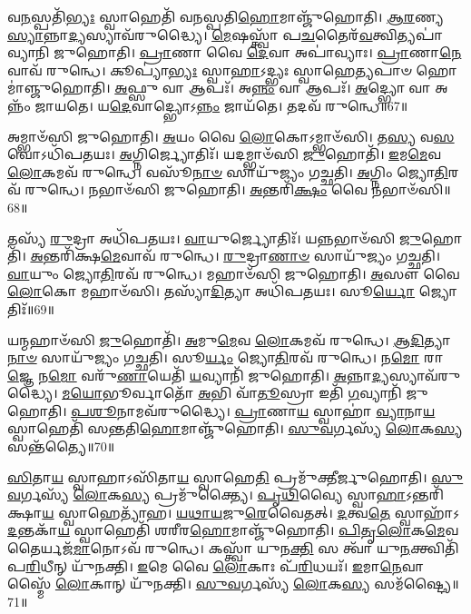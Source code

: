 𑌵\-\ul{𑌨}\-𑌸𑍍𑌪𑌤𑌿᳴\-\ul{𑌭𑍍𑌯𑌃} 𑌸𑍍𑌵𑌾𑌹𑍇𑌤𑌿᳴ 𑌵𑌨𑌸𑍍𑌪𑌤𑌿\-\ul{𑌹𑍋}\-𑌮𑌾𑌞𑍍𑌜𑍁᳴𑌹𑍋𑌤𑌿।
\-\ul{𑌆}\-\-\ul{𑌰}\-𑌣𑍍𑌯\-\ul{𑌸𑍍𑌯𑌾}\-\-𑌨𑍍𑌨𑌾\-\ul{𑌦𑍍𑌯}\-𑌸𑍍𑌯𑌾𑌵᳴𑌰𑍁𑌦𑍍𑌧𑍍𑌯𑍈।
\-\ul{𑌮𑍇}\-𑌷𑌸𑍍𑌤𑍍𑌵𑌾᳴ 𑌪\-\ul{𑌚}\-𑌤𑍈𑌰᳴\-\ul{𑌵}\-𑌤𑍍𑌵𑌿𑌤𑍍𑌯𑌪𑌾॑𑌵𑍍𑌯𑌾𑌨𑌿 𑌜𑍁𑌹𑍋𑌤𑌿।
\-\ul{𑌪𑍍𑌰𑌾}\-𑌣𑌾 𑌵𑍈 \ul{𑌦𑍇}\-𑌵𑌾 𑌅𑌪𑌾॑𑌵𑍍𑌯𑌾𑌃।
\-\ul{𑌪𑍍𑌰𑌾}\-𑌣𑌾\-\ul{𑌨𑍇}\-𑌵𑌾𑌵᳴ 𑌰𑍁𑌨𑍍𑌧𑍇।
𑌕𑍂𑌪𑍍𑌯𑌾॑\-\ul{𑌭𑍍𑌯𑌃} 𑌸𑍍𑌵𑌾\-\ul{𑌹𑌾}\-𑌽𑌦𑍍𑌭𑍍𑌯𑌃 𑌸𑍍𑌵𑌾𑌹𑍇\-\ul{𑌤𑍍𑌯}\-𑌪𑌾𑍞 𑌹𑍋𑌮𑌾॑𑌞𑍍𑌜𑍁𑌹𑍋𑌤𑌿।
\-\ul{𑌅}\-𑌫𑍍𑌸𑍁 𑌵𑌾 𑌆𑌪𑌃᳴।
𑌅\-\ul{𑌨𑍍𑌨𑌂} 𑌵𑌾 𑌆𑌪𑌃᳴।
\-\ul{𑌅}\-𑌦𑍍𑌭𑍍𑌯𑍋 𑌵𑌾 𑌅𑌨𑍍𑌨𑌂᳴ 𑌜𑌾𑌯𑌤𑍇।
𑌯\-\ul{𑌦𑍇}\-𑌵𑌾𑌦𑍍𑌭𑍍𑌯𑍋\-𑌽\-\ul{𑌨𑍍𑌨𑌂} 𑌜𑌾𑌯᳴𑌤𑍇।
𑌤𑌦𑌵᳴ 𑌰𑍁𑌨𑍍𑌧𑍇॥67॥\anuvakamend[\-\ul{𑌪𑍂}\-\-\ul{𑌰𑍍𑌵}\-\-\ul{𑌦𑍀}\-𑌕𑍍𑌷𑌾 𑌜𑍁᳴𑌹𑍋\-\ul{𑌤𑌿} 𑌪𑍂𑌰𑍍𑌵᳴ \ul{𑌏}\-𑌵 \ul{𑌦𑍍𑌵𑌿}\-𑌷\-\ul{𑌨𑍍𑌤𑌂} 𑌭𑍍𑌰𑌾𑌤𑍃᳴\-\ul{𑌵𑍍𑌯}\-𑌮𑌤𑌿᳴ 𑌕𑍍𑌰𑌾\-\ul{𑌮}\-𑌤𑍍𑌯𑌨᳴𑌨𑍍𑌤𑌰𑌿𑌤𑍍𑌯𑍈 𑌕𑍍𑌰𑌾𑌮𑌤𑌿 𑌰𑍁\-\ul{𑌨𑍍𑌧𑍇} 𑌜𑌾𑌯᳴\-\ul{𑌤} 𑌏𑌕𑌂᳴ 𑌚]

𑌅𑌮𑍍𑌭𑌾𑍞᳴𑌸𑌿 𑌜𑍁𑌹𑍋𑌤𑌿।
\-\ul{𑌅}\-𑌯𑌂 𑌵𑍈 \ul{𑌲𑍋}\-𑌕𑍋\-𑌽𑌮𑍍𑌭𑌾𑍞᳴𑌸𑌿।
𑌤\-\ul{𑌸𑍍𑌯} 𑌵\-\ul{𑌸}\-𑌵𑍋\-𑌽𑌧𑌿᳴𑌪𑌤𑌯𑌃।
\-\ul{𑌅}\-𑌗𑍍𑌨𑌿𑌰𑍍𑌜𑍍𑌯𑍋𑌤𑌿𑌃᳴।
𑌯𑌦𑌮𑍍𑌭𑌾𑍞᳴𑌸𑌿 \ul{𑌜𑍁}\-𑌹𑍋𑌤𑌿᳴।
\-\ul{𑌇}\-𑌮\-\ul{𑌮𑍇}\-𑌵 \ul{𑌲𑍋}\-𑌕𑌮𑌵᳴ 𑌰𑍁𑌨𑍍𑌧𑍇।
𑌵𑌸𑍂᳴\-\ul{𑌨𑌾}\-\-\ul{𑍞} 𑌸𑌾𑌯𑍁᳴𑌜𑍍𑌯𑌂 𑌗𑌚𑍍𑌛𑌤𑌿।
\-\ul{𑌅}\-𑌗𑍍𑌨𑌿𑌂 𑌜𑍍𑌯𑍋\-\ul{𑌤𑌿}\-𑌰𑌵᳴ 𑌰𑍁𑌨𑍍𑌧𑍇।
𑌨𑌭𑌾𑍞᳴𑌸𑌿 𑌜𑍁𑌹𑍋𑌤𑌿।
\-\ul{𑌅}\-𑌨𑍍𑌤𑌰𑌿᳴\-\ul{𑌕𑍍𑌷𑌂} 𑌵𑍈 𑌨𑌭𑌾𑍞᳴𑌸𑌿॥68॥

𑌤𑌸𑍍𑌯᳴ \ul{𑌰𑍁}\-𑌦𑍍𑌰𑌾 𑌅𑌧𑌿᳴𑌪𑌤𑌯𑌃।
\-\ul{𑌵𑌾}\-𑌯𑍁𑌰𑍍𑌜𑍍𑌯𑍋𑌤𑌿𑌃᳴।
𑌯𑌨𑍍𑌨𑌭𑌾𑍞᳴𑌸𑌿 \ul{𑌜𑍁}\-𑌹𑍋𑌤𑌿᳴।
\-\ul{𑌅}\-𑌨𑍍𑌤𑌰𑌿᳴𑌕𑍍𑌷\-\ul{𑌮𑍇}\-𑌵𑌾𑌵᳴ 𑌰𑍁𑌨𑍍𑌧𑍇।
\-\ul{𑌰𑍁}\-𑌦𑍍𑌰𑌾\-\ul{𑌣𑌾}\-\-\ul{𑍞} 𑌸𑌾𑌯𑍁᳴𑌜𑍍𑌯𑌂 𑌗𑌚𑍍𑌛𑌤𑌿।
\-\ul{𑌵𑌾}\-𑌯𑍁𑌂 𑌜𑍍𑌯𑍋\-\ul{𑌤𑌿}\-𑌰𑌵᳴ 𑌰𑍁𑌨𑍍𑌧𑍇।
𑌮𑌹𑌾𑍞᳴𑌸𑌿 𑌜𑍁𑌹𑍋𑌤𑌿।
\-\ul{𑌅}\-𑌸𑍗 𑌵𑍈 \ul{𑌲𑍋}\-𑌕𑍋 𑌮𑌹𑌾𑍞᳴𑌸𑌿।
𑌤𑌸𑍍𑌯𑌾᳴\-\ul{𑌦𑌿}\-𑌤𑍍𑌯𑌾 𑌅𑌧𑌿᳴𑌪𑌤𑌯𑌃।
𑌸𑍂\-\ul{𑌰𑍍𑌯𑍋} 𑌜𑍍𑌯𑍋𑌤𑌿𑌃᳴॥69॥

𑌯𑌨𑍍𑌮𑌹𑌾𑍞᳴𑌸𑌿 \ul{𑌜𑍁}\-𑌹𑍋𑌤𑌿᳴।
\-\ul{𑌅}\-𑌮𑍁\-\ul{𑌮𑍇}\-𑌵 \ul{𑌲𑍋}\-𑌕𑌮𑌵᳴ 𑌰𑍁𑌨𑍍𑌧𑍇।
\-\ul{𑌆}\-\-\ul{𑌦𑌿}\-𑌤𑍍𑌯𑌾\-\ul{𑌨𑌾}\-\-\ul{𑍞} 𑌸𑌾𑌯𑍁᳴𑌜𑍍𑌯𑌂 𑌗𑌚𑍍𑌛𑌤𑌿।
𑌸𑍂\-\ul{𑌰𑍍𑌯𑌂} 𑌜𑍍𑌯𑍋\-\ul{𑌤𑌿}\-𑌰𑌵᳴ 𑌰𑍁𑌨𑍍𑌧𑍇।
𑌨\-\ul{𑌮𑍋} 𑌰𑌾\-\ul{𑌜𑍍𑌞𑍇} 𑌨\-\ul{𑌮𑍋} 𑌵𑌰𑍁᳴\-\ul{𑌣𑌾}\-𑌯𑍇𑌤𑌿᳴ \ul{𑌯}\-𑌵𑍍𑌯𑌾𑌨𑌿᳴ 𑌜𑍁𑌹𑍋𑌤𑌿।
\-\ul{𑌅}\-𑌨𑍍𑌨𑌾\-\ul{𑌦𑍍𑌯}\-𑌸𑍍𑌯𑌾𑌵᳴𑌰𑍁𑌦𑍍𑌧𑍍𑌯𑍈।
\-\ul{𑌮}\-\-\ul{𑌯𑍋}\-𑌭𑍂𑌰𑍍𑌵𑌾𑌤𑍋᳴ \ul{𑌅}\-𑌭𑌿 𑌵𑌾᳴\-\ul{𑌤𑍂}\-𑌸𑍍𑌰𑌾 𑌇𑌤𑌿᳴ \ul{𑌗}\-𑌵𑍍𑌯𑌾𑌨𑌿᳴ 𑌜𑍁𑌹𑍋𑌤𑌿।
\-\ul{𑌪}\-\-\ul{𑌶𑍂}\-𑌨𑌾𑌮𑌵᳴𑌰𑍁𑌦𑍍𑌧𑍍𑌯𑍈।
\-\ul{𑌪𑍍𑌰𑌾}\-𑌣𑌾\-\ul{𑌯} 𑌸𑍍𑌵𑌾𑌹𑌾॑ \ul{𑌵𑍍𑌯𑌾}\-𑌨𑌾\-\ul{𑌯} 𑌸𑍍𑌵𑌾𑌹𑍇𑌤𑌿᳴ 𑌸𑌨𑍍𑌤𑌤𑌿\-\ul{𑌹𑍋}\-𑌮𑌾𑌞𑍍𑌜𑍁᳴𑌹𑍋𑌤𑌿।
\-\ul{𑌸𑍁}\-\-\ul{𑌵}\-𑌰𑍍𑌗𑌸𑍍𑌯᳴ \ul{𑌲𑍋}\-𑌕\-\ul{𑌸𑍍𑌯} 𑌸𑌨𑍍𑌤᳴𑌤𑍍𑌯𑍈॥70॥

\-\ul{𑌸𑌿}\-𑌤𑌾\-\ul{𑌯} 𑌸𑍍𑌵𑌾𑌹𑌾\-𑌽𑌸𑌿᳴𑌤𑌾\-\ul{𑌯} 𑌸𑍍𑌵𑌾𑌹𑍇\-\ul{𑌤𑌿} 𑌪𑍍𑌰𑌮𑍁᳴𑌕𑍍𑌤𑍀𑌰𑍍𑌜𑍁𑌹𑍋𑌤𑌿।
\-\ul{𑌸𑍁}\-\-\ul{𑌵}\-𑌰𑍍𑌗𑌸𑍍𑌯᳴ \ul{𑌲𑍋}\-𑌕\-\ul{𑌸𑍍𑌯} 𑌪𑍍𑌰𑌮𑍁᳴𑌕𑍍𑌤𑍍𑌯𑍈।
\-\ul{𑌪𑍃}\-\-\ul{𑌥𑌿}\-𑌵𑍍𑌯𑍈 𑌸𑍍𑌵𑌾\-\ul{𑌹𑌾}\-\-𑌽𑌨𑍍𑌤𑌰𑌿᳴𑌕𑍍𑌷𑌾\-\ul{𑌯} 𑌸𑍍𑌵𑌾𑌹𑍇𑌤𑍍𑌯𑌾᳴𑌹।
\-\ul{𑌯}\-\-\ul{𑌥𑌾}\-\-\ul{𑌯}\-𑌜𑍁\-\ul{𑌰𑍇}\-𑌵𑍈𑌤𑌤𑍍।
\-\ul{𑌦}\-𑌤𑍍𑌵\-\ul{𑌤𑍇} 𑌸𑍍𑌵𑌾𑌹𑌾᳴\-𑌽\-\ul{𑌦}\-𑌨𑍍𑌤𑌕𑌾᳴\-\ul{𑌯} 𑌸𑍍𑌵𑌾𑌹𑍇𑌤𑌿᳴ 𑌶𑌰𑍀𑌰\-\ul{𑌹𑍋}\-𑌮𑌾𑌞𑍍𑌜𑍁᳴𑌹𑍋𑌤𑌿।
\-\ul{𑌪𑌿}\-\-\ul{𑌤𑍃}\-\-\ul{𑌲𑍋}\-𑌕\-\ul{𑌮𑍇}\-𑌵 𑌤𑍈𑌰𑍍𑌯𑌜᳴\-\ul{𑌮𑌾}\-𑌨𑍋𑌽𑌵᳴ 𑌰𑍁𑌨𑍍𑌧𑍇।
𑌕𑌸𑍍𑌤𑍍𑌵𑌾᳴ 𑌯𑍁𑌨\-\ul{𑌕𑍍𑌤𑌿} 𑌸 𑌤𑍍𑌵𑌾᳴ 𑌯𑍁\-\ul{𑌨}\-𑌕𑍍𑌤𑍍𑌵𑌿𑌤𑌿᳴ 𑌪\-\ul{𑌰𑌿}\-𑌧𑍀𑌨𑍍 𑌯𑍁᳴𑌨𑌕𑍍𑌤𑌿।
\-\ul{𑌇}\-𑌮𑍇 𑌵𑍈 \ul{𑌲𑍋}\-𑌕𑌾𑌃 𑌪᳴\-\ul{𑌰𑌿}\-𑌧𑌯𑌃᳴।
\-\ul{𑌇}\-𑌮𑌾\-\ul{𑌨𑍇}\-𑌵𑌾𑌸𑍍𑌮𑍈᳴ \ul{𑌲𑍋}\-𑌕𑌾𑌨𑍍 𑌯𑍁᳴𑌨𑌕𑍍𑌤𑌿।
\-\ul{𑌸𑍁}\-\-\ul{𑌵}\-𑌰𑍍𑌗𑌸𑍍𑌯᳴ \ul{𑌲𑍋}\-𑌕\-\ul{𑌸𑍍𑌯} 𑌸𑌮᳴𑌷𑍍𑌟𑍍𑌯𑍈॥71॥

